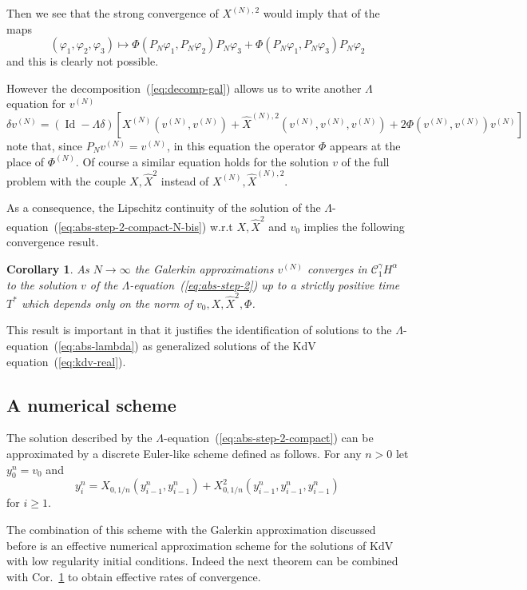 \documentclass[a4paper,12pt,reqno]{article}
\newcommand{\der}{\delta}
\newcommand{\CC}{\mathcal{C}}
\DeclareMathOperator{\id}{\text{Id}}
\newtheorem{corollary}[theorem]{Corollary}
\begin{document}
Then we see that the strong convergence of $X^{(N),2}$ would imply that of the maps
$$
(\varphi_1,\varphi_2,\varphi_3) \mapsto \Phi(P_N \varphi_1,P_N \varphi_2) P_N\varphi_3 + \Phi(P_N \varphi_1,P_N \varphi_3) P_N \varphi_2
$$
and this is clearly not possible.

However the decomposition~(\ref{eq:decomp-gal}) allows us to write another $\Lambda$ equation for $v^{(N)}$
\begin{equation}
  \label{eq:abs-step-2-compact-N-bis}
\der v^{(N)} = (\id - \Lambda \der)[X^{(N)}(v^{(N)},v^{(N)})+\hat X^{(N),2}(v^{(N)},v^{(N)},v^{(N)})+ 2 \Phi(v^{(N)},v^{(N)}) v^{(N)}]
\end{equation}
note that, since $P_N v^{(N)} = v^{(N)}$, in this equation the
operator $\Phi$ appears at the place of $\Phi^{(N)}$. Of course a
similar equation holds for the solution $v$ of the full problem with
the couple $X,\hat X^2$ instead of $ X^{(N)},\hat X^{(N),2}$. 

As a consequence, the Lipschitz continuity of the solution of the
$\Lambda$-equation~(\ref{eq:abs-step-2-compact-N-bis}) w.r.t $X,\hat X^2$ and $v_0$ implies
the following convergence result.

\begin{corollary}
\label{cor:galerkin}
As $N \to \infty$ the Galerkin approximations $v^{(N)}$ converges in $\CC_1^\gamma H^\alpha$ to
the solution $v$ of the $\Lambda$-equation~(\ref{eq:abs-step-2}) up to
a strictly positive time $T^*$ which depends only on the norm of
$v_0,X,\hat X^2, \Phi$.  
\end{corollary}

This result is important in that it justifies the identification of
solutions to the $\Lambda$-equation~(\ref{eq:abs-lambda}) as
generalized solutions of the  KdV equation~(\ref{eq:kdv-real}). 



\subsection{A numerical scheme}
\label{sec:euler}
The solution described by the
$\Lambda$-equation~(\ref{eq:abs-step-2-compact}) can be approximated
by a discrete Euler-like scheme defined as follows. For any $n >0$ let $y^n_0=v_0$
and 
$$
y^n_i = X_{0, 1/n}(y^n_{i-1},y^n_{i-1}) + X^2_{0, 1/n}(y^n_{i-1},y^n_{i-1},y^n_{i-1})
$$
for $i\ge 1$. 

The combination of  this scheme with the Galerkin approximation
discussed before is an effective  numerical  approximation scheme for the
solutions of KdV with low regularity initial conditions. Indeed the next theorem  can  be combined with
Cor.~\ref{cor:galerkin} to obtain effective rates of convergence.
\end{document}
